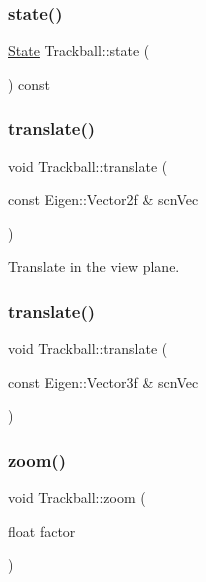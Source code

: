 \subsubsection{\texorpdfstring{state()}{state()}}
{\footnotesize\ttfamily \hyperlink{class_trackball_a102216413a87cb37801044063a1b05be}{State} Trackball\+::state (\begin{DoxyParamCaption}{ }\end{DoxyParamCaption}) const}

\mbox{\label{class_trackball_aa4f8422c14007f8b27a3b469abe7b1e2}} 
\subsubsection{\texorpdfstring{translate()}{translate()}\hspace{0.1cm}{\footnotesize\ttfamily [1/2]}}
{\footnotesize\ttfamily void Trackball\+::translate (\begin{DoxyParamCaption}\item[{const Eigen\+::\+Vector2f \&}]{scn\+Vec }\end{DoxyParamCaption})}



Translate in the view plane. 

\mbox{\label{class_trackball_a1a40442f993381ffcba90edacb1d1957}} 
\subsubsection{\texorpdfstring{translate()}{translate()}\hspace{0.1cm}{\footnotesize\ttfamily [2/2]}}
{\footnotesize\ttfamily void Trackball\+::translate (\begin{DoxyParamCaption}\item[{const Eigen\+::\+Vector3f \&}]{scn\+Vec }\end{DoxyParamCaption})}

\mbox{\label{class_trackball_afe05c150d9bf2301250f8a47080d9a7e}} 
\subsubsection{\texorpdfstring{zoom()}{zoom()}}
{\footnotesize\ttfamily void Trackball\+::zoom (\begin{DoxyParamCaption}\item[{float}]{factor }\end{DoxyParamCaption})}



